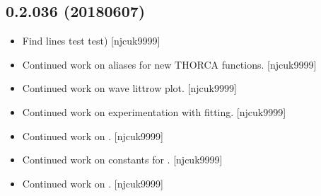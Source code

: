 \documentclass[a4paper,10pt,english]{report}
\begin{document}
\subsection{0.2.036 (2018\sphinxhyphen{}06\sphinxhyphen{}07)}
\label{\detokenize{misc/changelog:id445}}\begin{itemize}
\item {} 
Find lines test  test) {[}njcuk9999{]}

\item {} 
Continued work on  \sphinxhyphen{} aliases for new THORCA functions.
{[}njcuk9999{]}

\item {} 
Continued work on  \sphinxhyphen{} wave littrow plot. {[}njcuk9999{]}

\item {} 
Continued work on  \sphinxhyphen{} experimentation with fitting. {[}njcuk9999{]}

\item {} 
Continued work on . {[}njcuk9999{]}

\item {} 
Continued work on  \sphinxhyphen{} constants for . {[}njcuk9999{]}

\item {} 
Continued work on . {[}njcuk9999{]}

\end{itemize}
\end{document}
